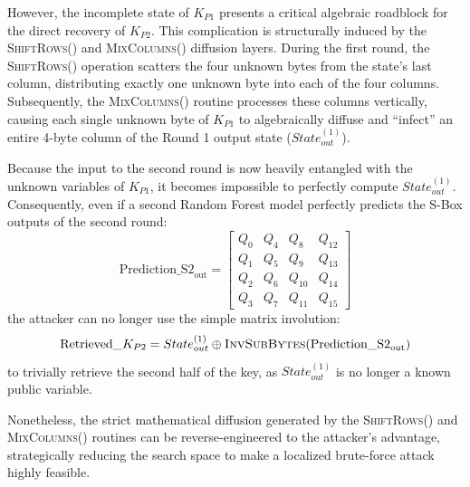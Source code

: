 \documentclass[11pt,a4paper]{report}
\begin{document}
However, the incomplete state of $K_{P1}$ presents a critical algebraic roadblock for the direct recovery of $K_{P2}$. 
This complication is structurally induced by the \textsc{ShiftRows()} and \textsc{MixColumns()} diffusion layers. 
During the first round, the \textsc{ShiftRows()} operation scatters the four unknown bytes from the state's last column, distributing exactly one unknown byte into each of the four columns. 
Subsequently, the \textsc{MixColumns()} routine processes these columns vertically, causing each single unknown byte of $K_{P1}$ to algebraically diffuse and ``infect'' an entire 4-byte column of the Round 1 output state ($State^{(1)}_{out}$).

Because the input to the second round is now heavily entangled with the unknown variables of $K_{P1}$, it becomes impossible to perfectly compute $State^{(1)}_{out}$. 
Consequently, even if a second Random Forest model perfectly predicts the S-Box outputs of the second round:
\begin{equation}
\text{Prediction\_S2}_{\text{out}} = \begin{bmatrix}
    Q_0 & Q_4 & Q_8 & Q_{12} \\
    Q_1 & Q_5 & Q_9 & Q_{13} \\
    Q_2 & Q_6 & Q_{10} & Q_{14} \\
    Q_3 & Q_7 & Q_{11} & Q_{15}
\end{bmatrix}
\end{equation}
the attacker can no longer use the simple matrix involution:
\begin{equation}
\text{Retrieved\_}K_{P2} = State^{(1)}_{out} \oplus \textsc{InvSubBytes}(\text{Prediction\_S2}_{\text{out}})
\end{equation}
to trivially retrieve the second half of the key, as $State^{(1)}_{out}$ is no longer a known public variable.

Nonetheless, the strict mathematical diffusion generated by the \textsc{ShiftRows()} and \textsc{MixColumns()} routines can be reverse-engineered to the attacker's advantage, 
strategically reducing the search space to make a localized brute-force attack highly feasible. 
\end{document}
